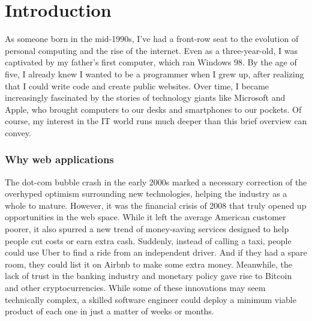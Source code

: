 \chapter*{Introduction}
\par
As someone born in the mid-1990s, I've had a front-row seat to the evolution of personal computing and the rise of the internet. Even as a three-year-old, I was captivated by my father's first computer, which ran Windows 98. By the age of five, I already knew I wanted to be a programmer when I grew up, after realizing that I could write code and create public websites. Over time, I became increasingly fascinated by the stories of technology giants like Microsoft and Apple, who brought computers to our desks and smartphones to our pockets. Of course, my interest in the IT world runs much deeper than this brief overview can convey.
\subsection*{Why web applications}
\par
The dot-com bubble crash in the early 2000s marked a necessary correction of the overhyped optimism surrounding new technologies, helping the industry as a whole to mature. However, it was the financial crisis of 2008 that truly opened up opportunities in the web space. While it left the average American customer poorer, it also spurred a new trend of money-saving services designed to help people cut costs or earn extra cash. Suddenly, instead of calling a taxi, people could use Uber to find a ride from an independent driver. And if they had a spare room, they could list it on Airbnb to make some extra money. Meanwhile, the lack of trust in the banking industry and monetary policy gave rise to Bitcoin and other cryptocurrencies. While some of these innovations may seem technically complex, a skilled software engineer could deploy a minimum viable product of each one in just a matter of weeks or months.
